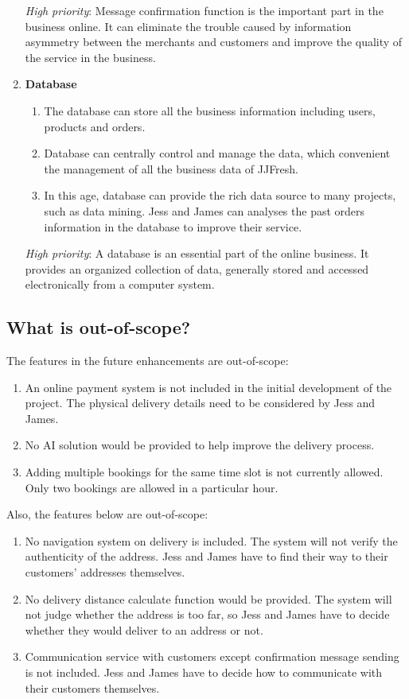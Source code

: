 \documentclass{report}
\begin{document}
\begin{enumerate}
  \textit{High priority}: Message confirmation function is the important part in the business online. It can eliminate the trouble caused by information asymmetry between the merchants and customers and improve the quality of the service in the business.

  \item \textbf{Database}   
  \begin{enumerate}
    \item The database can store all the business information including users, products and orders.
    \item Database can centrally control and manage the data, which convenient the management of all the business data of JJFresh.
    \item In this age, database can provide the rich data source to many projects, such as data mining. Jess and James can analyses the past orders information in the database to improve their service.
  \end{enumerate}
  
  \textit{High priority}: A database is an essential part of the online business. It provides an organized collection of data, generally stored and accessed electronically from a computer system.
\end{enumerate}
\subsection{What is out-of-scope?}
The features in the future enhancements are out-of-scope:
\begin{enumerate}
  \item An online payment system is not included in the initial development of the project. The physical delivery details need to be considered by Jess and James.
  \item No AI solution would be provided to help improve the delivery process.
  \item Adding multiple bookings for the same time slot is not currently allowed. Only two bookings are allowed in a particular hour.
\end{enumerate}

Also, the features below are out-of-scope:
\begin{enumerate}
  \item No navigation system on delivery is included. The system will not verify the authenticity of the address. Jess and James have to find their way to their customers' addresses themselves.
  \item No delivery distance calculate function would be provided. The system will not judge whether the address is too far, so Jess and James have to decide whether they would deliver to an address or not.
  \item Communication service with customers except confirmation message sending is not included. Jess and James have to decide how to communicate with their customers themselves.
\end{enumerate}
\end{document}
